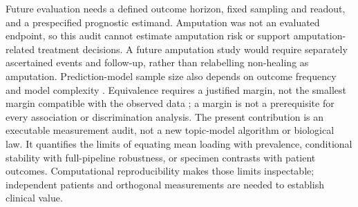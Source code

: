 Future evaluation needs a defined outcome horizon, fixed sampling and readout, and a prespecified prognostic estimand. Amputation was not an evaluated endpoint, so this audit cannot estimate amputation risk or support amputation-related treatment decisions. A future amputation study would require separately ascertained events and follow-up, rather than relabelling non-healing as amputation. Prediction-model sample size also depends on outcome frequency and model complexity \citep{riley2019}. Equivalence requires a justified margin, not the smallest margin compatible with the observed data \citep{lakens2017}; a margin is not a prerequisite for every association or discrimination analysis. The present contribution is an executable measurement audit, not a new topic-model algorithm or biological law. It quantifies the limits of equating mean loading with prevalence, conditional stability with full-pipeline robustness, or specimen contrasts with patient outcomes. Computational reproducibility makes those limits inspectable; independent patients and orthogonal measurements are needed to establish clinical value.
